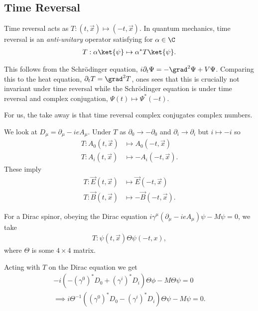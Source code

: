 
\subsection{Time Reversal}

Time reversal acts as $T : \left( t, \vec{x} \right) \mapsto \left( -t, \vec{x} \right) $.  In quantum mechanics, time reversal is an \emph{anti-unitary} operator satisfying for $\alpha \in \C$
\begin{align}
    T : \alpha \ket{\psi} \mapsto \alpha^{*} T \ket{\psi}
.\end{align}

This follows from the Schrödinger equation, $i \partial_t \Psi = - \grad^2 \Psi + V \Psi$. Comparing this to the heat equation, $\partial_t T = \grad^2 T$, ones sees that this is crucially not invariant under time reversal while the Schrödinger equation is under time reversal and complex conjugation, $\Psi \left( t \right) \mapsto \Psi^{*}\left( -t \right)$.

For us, the take away is that time reversal complex conjugates complex numbers.

\begin{example}
    We look at $D_\mu = \partial_\mu -ie A_\mu$.
    Under $T$ as $\partial_0 \to - \partial_0$ and $\partial_i \to  \partial_i$  but $i \mapsto -i$ so 
    \begin{align}
        T : A_0 \left( t, \vec{x} \right) &\mapsto A_0 \left( -t, \vec{x} \right) \\
        T : A_i \left( t, \vec{x} \right) &\mapsto - A_i \left( -t, \vec{x} \right)
    .\end{align}
    These imply
    \begin{align}
        T : \vec{E}\left( t,\vec{x} \right) &\mapsto \vec{E} \left( -t, \vec{x} \right) \\
        T : \vec{B}\left( t, \vec{x} \right) &\mapsto - \vec{B}\left( -t, \vec{x} \right)
    .\end{align}
\end{example}

For a Dirac spinor, obeying the Dirac equation $i \gamma^{\mu} \left( \partial_\mu - i e A_\mu \right) \psi - M \psi = 0$, we take
\begin{align}
    T : \psi \left( t, \vec{x} \right) \Theta \psi \left( -t, x \right) 
,\end{align}
where $\Theta$ is some $4 \times 4$ matrix.

Acting with $T$ on the Dirac equation we get
\begin{align}
    -i \left( - \left( \gamma^{0} \right)^{*} D_0 + \left( \gamma^{i} \right)^{*} D_i  \right) \Theta \phi - M \Theta \psi = 0 \\ 
    \implies i \Theta^{-1} \left( \left( \gamma^{0} \right)^{*} D_0 - \left( \gamma^{i} \right)^{*} D_i \right) \Theta \psi - M \psi = 0
.\end{align}

